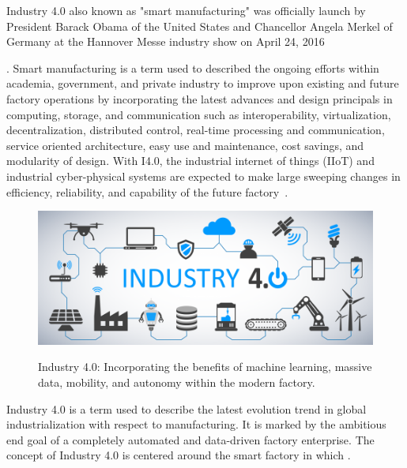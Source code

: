 Industry 4.0 also known as "smart manufacturing" was officially launch by President Barack Obama of the United States and Chancellor Angela Merkel of Germany at the Hannover Messe industry show on April 24, 2016{\cite{HannoverMesse2016:Report, HannoverMesse2016:MachineDesign}.  Smart manufacturing is a term used to described the ongoing efforts within academia, government, and private industry to improve upon existing and future factory operations by incorporating the latest advances and design principals in computing, storage, and communication such as interoperability, virtualization, decentralization, distributed control, real-time processing and communication, service oriented architecture, easy use and maintenance, cost savings, and modularity of design.  With I4.0, the industrial internet of things (IIoT) and industrial cyber-physical systems are expected to make large sweeping changes in efficiency, reliability, and capability of the future factory~\cite{Raptis2019}.

\begin{figure}[!tbp]
	\begin{center}
		\includegraphics[width=\textwidth]{./chapter-intro/images/intro/forbes-i40.png}
		\label{fig:intro:forbes-i40}
		\caption{Industry 4.0: Incorporating the benefits of machine learning, massive data, mobility, and autonomy within the modern factory.  }
	\end{center}
\end{figure}

Industry 4.0 is a term used to describe the latest evolution trend in global industrialization with respect to manufacturing.  It is marked by the ambitious end goal of a completely automated and data-driven factory enterprise.  The concept of Industry 4.0 is centered around the smart factory in which . 

}

